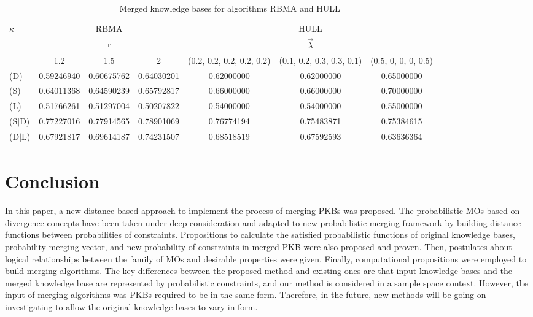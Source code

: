 \documentclass[]{iosart2c}
\begin{document}
  \begin{table}[htb]
    \caption{Merged knowledge bases for algorithms RBMA and HULL}
    \begin{tabular}{l c c c c c c c c}
      \hline
      {$\kappa$} & \multicolumn{3}{c}{RBMA} & \multicolumn{3}{c}{HULL} \\
      & \multicolumn{3}{c}{r} & \multicolumn{3}{c}{$\vec{\lambda}$} \\
      & 1.2        & 1.5        & 2          & (0.2, 0.2, 0.2, 0.2, 0.2) & (0.1, 0.2, 0.3, 0.3, 0.1) & (0.5, 0, 0, 0, 0.5) \\
      \hline
      (D)     & 0.59246940 & 0.60675762 & 0.64030201 & 0.62000000                & 0.62000000                & 0.65000000\\
      (S)     & 0.64011368 & 0.64590239 & 0.65792817 & 0.66000000                & 0.66000000                & 0.70000000\\
      (L)     & 0.51766261 & 0.51297004 & 0.50207822 & 0.54000000                & 0.54000000                & 0.55000000\\
      (S$|$D) & 0.77227016 & 0.77914565 & 0.78901069 & 0.76774194                & 0.75483871                & 0.75384615\\
      (D$|$L) & 0.67921817 & 0.69614187 & 0.74231507 & 0.68518519                & 0.67592593                & 0.63636364          \\
    \end{tabular}
  \end{table}


  \section{Conclusion}

  In this paper, a new distance-based approach to implement the process of merging PKBs was proposed. The probabilistic MOs based on divergence concepts have been taken under deep consideration and adapted to new probabilistic merging framework by building distance functions between probabilities of constraints. Propositions to calculate the satisfied probabilistic functions of original knowledge bases, probability merging vector, and new probability of constraints in merged PKB were also proposed and proven. Then, postulates about logical relationships between the family of MOs and desirable properties were given. Finally, computational propositions were employed to build merging algorithms. The key differences between the proposed method and existing ones are that input knowledge bases and the merged knowledge base are represented by probabilistic constraints, and our method is considered in a sample space context. However, the input of merging algorithms was PKBs required to be in the same form. Therefore, in the future, new methods will be going on investigating to allow the original knowledge bases to vary in form.
\end{document}

